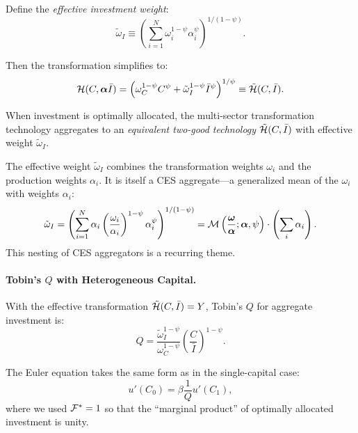 Define the \emph{effective investment weight}:
\begin{equation}
\tilde{\omega}_I \equiv \left( \sum_{i=1}^{N} \omega_i^{1-\psi} \alpha_i^{\psi} \right)^{1/(1-\psi)}.
\label{eq:ac-het-omega-tilde}
\end{equation}

Then the transformation simplifies to:
\begin{equation}
\mathcal{H}(C, \boldsymbol{\alpha} \bar{I}) = \left( \omega_C^{1-\psi} C^{\psi} + \tilde{\omega}_I^{1-\psi} \bar{I}^{\psi} \right)^{1/\psi} \equiv \tilde{\mathcal{H}}(C, \bar{I}).
\label{eq:ac-het-H-effective}
\end{equation}

\begin{calloutimportant}
When investment is optimally allocated, the multi-sector transformation technology aggregates to an \emph{equivalent two-good technology} $\tilde{\mathcal{H}}(C, \bar{I})$ with effective weight $\tilde{\omega}_I$.

The effective weight $\tilde{\omega}_I$ combines the transformation weights $\omega_i$ and the production weights $\alpha_i$. It is itself a CES aggregate---a generalized mean of the $\omega_i$ with weights $\alpha_i$:
\[
\tilde{\omega}_I = \left( \sum_{i=1}^{N} \alpha_i \left( \frac{\omega_i}{\alpha_i} \right)^{1-\psi} \alpha_i^{\psi} \right)^{1/(1-\psi)} = \mathcal{M}\left( \frac{\boldsymbol{\omega}}{\boldsymbol{\alpha}}; \boldsymbol{\alpha}, \psi \right) \cdot \left( \sum_i \alpha_i \right).
\]
This nesting of CES aggregators is a recurring theme.
\end{calloutimportant}

\paragraph{Tobin's $Q$ with Heterogeneous Capital.}
With the effective transformation $\tilde{\mathcal{H}}(C, \bar{I}) = Y$, Tobin's $Q$ for aggregate investment is:
\begin{equation}
Q = \frac{\tilde{\omega}_I^{1-\psi}}{\omega_C^{1-\psi}} \left( \frac{C}{\bar{I}} \right)^{1-\psi}.
\label{eq:ac-het-Q}
\end{equation}

The Euler equation takes the same form as in the single-capital case:
\begin{equation}
u'(C_0) = \beta \frac{1}{Q} u'(C_1),
\label{eq:ac-het-euler}
\end{equation}
where we used $\mathcal{F}^* = 1$ so that the ``marginal product'' of optimally allocated investment is unity.

